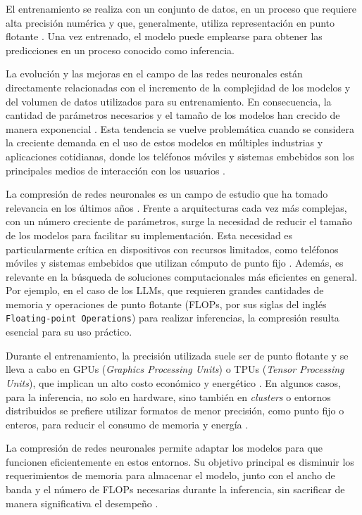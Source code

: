 El entrenamiento se realiza con un conjunto de datos, en un proceso que requiere
alta precisión numérica y que, generalmente, utiliza representación en punto flotante \cite{Goodfellow2016}.
Una vez entrenado, el modelo puede emplearse para obtener las predicciones en un proceso conocido como inferencia.

La evolución y las mejoras en el campo de las redes neuronales están directamente relacionadas
con el incremento de la complejidad de los modelos y del volumen de datos utilizados para su entrenamiento.
En consecuencia, la cantidad de parámetros necesarios y el tamaño de los modelos han crecido de manera exponencial \cite{DBLP:journals/corr/abs-2001-08361}.
Esta tendencia se vuelve problemática cuando se considera la creciente demanda en el uso de estos modelos en múltiples industrias
y aplicaciones cotidianas, donde los teléfonos móviles y sistemas embebidos son los principales medios de interacción con los usuarios \cite{Lane2017}.

La compresión de redes neuronales es un campo de estudio que ha tomado relevancia en los últimos años \cite{DBLP:journals/corr/abs-2010-03954}.
Frente a arquitecturas cada vez más complejas, con un número creciente de parámetros, surge la necesidad de reducir el tamaño de los modelos para facilitar su implementación.
Esta necesidad es particularmente crítica en dispositivos con recursos limitados, como teléfonos móviles
y sistemas embebidos que utilizan cómputo de punto fijo \cite{Gupta2015}. Además, es relevante en la búsqueda de soluciones computacionales más eficientes en general.
Por ejemplo, en el caso de los LLMs, que requieren grandes cantidades de memoria y operaciones de punto flotante (FLOPs, por sus siglas del inglés \texttt{Floating-point Operations}) para realizar inferencias, la compresión resulta esencial para su uso práctico.

Durante el entrenamiento, la precisión utilizada suele ser de punto flotante y se lleva a cabo
en GPUs (\textit{Graphics Processing Units}) o TPUs (\textit{Tensor Processing Units}), que implican un alto costo económico y energético \cite{Strubell2019}. En algunos casos, para la inferencia, no solo en hardware, sino también en \textit{clusters} o entornos distribuidos se prefiere utilizar formatos de menor precisión, como punto fijo o enteros, para reducir el consumo de memoria y energía \cite{Jacob2018}.

La compresión de redes neuronales permite adaptar los modelos para que funcionen eficientemente en estos entornos. Su objetivo principal es disminuir los requerimientos de memoria para almacenar el modelo, junto con el ancho de banda y el número de FLOPs necesarias durante la inferencia, sin sacrificar de manera significativa el desempeño \cite{8253600}.

